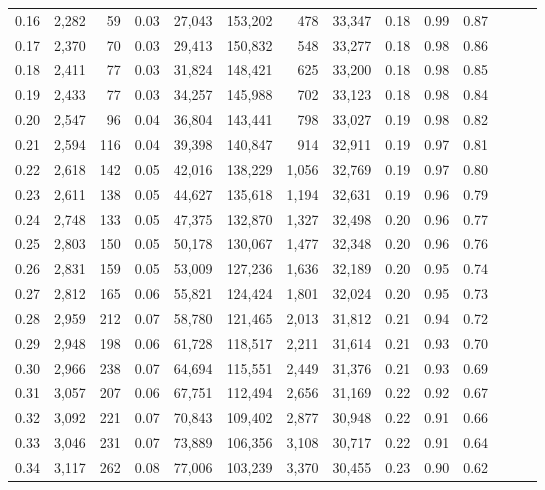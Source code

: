 \begin{tabular}{rrrrrrrrrrrrrr}
0.16 &  2,282 &   59 &  0.03 &   27,043 &  153,202 &     478 &  33,347 &  0.18 &  0.99 &      0.87 \\
0.17 &  2,370 &   70 &  0.03 &   29,413 &  150,832 &     548 &  33,277 &  0.18 &  0.98 &      0.86 \\
0.18 &  2,411 &   77 &  0.03 &   31,824 &  148,421 &     625 &  33,200 &  0.18 &  0.98 &      0.85 \\
0.19 &  2,433 &   77 &  0.03 &   34,257 &  145,988 &     702 &  33,123 &  0.18 &  0.98 &      0.84 \\
0.20 &  2,547 &   96 &  0.04 &   36,804 &  143,441 &     798 &  33,027 &  0.19 &  0.98 &      0.82 \\
0.21 &  2,594 &  116 &  0.04 &   39,398 &  140,847 &     914 &  32,911 &  0.19 &  0.97 &      0.81 \\
0.22 &  2,618 &  142 &  0.05 &   42,016 &  138,229 &   1,056 &  32,769 &  0.19 &  0.97 &      0.80 \\
0.23 &  2,611 &  138 &  0.05 &   44,627 &  135,618 &   1,194 &  32,631 &  0.19 &  0.96 &      0.79 \\
0.24 &  2,748 &  133 &  0.05 &   47,375 &  132,870 &   1,327 &  32,498 &  0.20 &  0.96 &      0.77 \\
0.25 &  2,803 &  150 &  0.05 &   50,178 &  130,067 &   1,477 &  32,348 &  0.20 &  0.96 &      0.76 \\
0.26 &  2,831 &  159 &  0.05 &   53,009 &  127,236 &   1,636 &  32,189 &  0.20 &  0.95 &      0.74 \\
0.27 &  2,812 &  165 &  0.06 &   55,821 &  124,424 &   1,801 &  32,024 &  0.20 &  0.95 &      0.73 \\
0.28 &  2,959 &  212 &  0.07 &   58,780 &  121,465 &   2,013 &  31,812 &  0.21 &  0.94 &      0.72 \\
0.29 &  2,948 &  198 &  0.06 &   61,728 &  118,517 &   2,211 &  31,614 &  0.21 &  0.93 &      0.70 \\
0.30 &  2,966 &  238 &  0.07 &   64,694 &  115,551 &   2,449 &  31,376 &  0.21 &  0.93 &      0.69 \\
0.31 &  3,057 &  207 &  0.06 &   67,751 &  112,494 &   2,656 &  31,169 &  0.22 &  0.92 &      0.67 \\
0.32 &  3,092 &  221 &  0.07 &   70,843 &  109,402 &   2,877 &  30,948 &  0.22 &  0.91 &      0.66 \\
0.33 &  3,046 &  231 &  0.07 &   73,889 &  106,356 &   3,108 &  30,717 &  0.22 &  0.91 &      0.64 \\
0.34 &  3,117 &  262 &  0.08 &   77,006 &  103,239 &   3,370 &  30,455 &  0.23 &  0.90 &      0.62 \\

\end{tabular}
